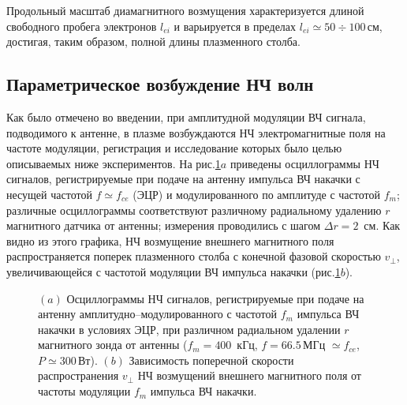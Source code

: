\documentclass[autoref,10pt]{disser}
\begin{document}
Продольный масштаб диамагнитного возмущения характеризуется длиной свободного пробега электронов $l_{ei}$ и варьируется в пределах $l_{ei}\simeq{}50\div{}100$\,см, достигая, таким образом, полной длины плазменного столба. 


\subsection{Параметрическое возбуждение НЧ волн}
Как было отмечено во введении, при амплитудной модуляции ВЧ сигнала, подводимого к антенне, в плазме возбуждаются НЧ электромагнитные поля на частоте модуляции, регистрация и исследование которых было целью описываемых ниже экспериментов.
На \mbox{рис.\ref{fig:phase_composite}$a$} приведены  осциллограммы НЧ сигналов, регистрируемые при подаче на антенну импульса ВЧ накачки с несущей частотой $f\simeq{}f_{ce}$ (ЭЦР) и модулированного по амплитуде с частотой $f_{m}$; различные осциллограммы соответствуют различному радиальному удалению $r$ магнитного датчика от антенны; измерения проводились с шагом $\Delta{}r = 2$~см. Как видно из этого графика, НЧ возмущение внешнего магнитного поля распространяется поперек плазменного столба с конечной фазовой скоростью $v_{\perp}$, увеличивающейся с частотой модуляции ВЧ импульса накачки (\mbox{рис.\ref{fig:phase_composite}$b$}).
\begin{figure}[H]
  \centering
  \def\svgwidth{0.6\columnwidth} %
  
  \caption{$(a)$ Осциллограммы НЧ сигналов, регистрируемые при подаче на антенну амплитудно--модулированного с частотой $f_{m}$ импульса ВЧ накачки в условиях ЭЦР, при различном радиальном удалении $r$ магнитного зонда от антенны ($f_{m} = 400$\, кГц, $f=66.5$\,МГц $\simeq f_{ce}$, $P\simeq 300$\,Вт). $(b)$ Зависимость поперечной скорости распространения $v_{\perp}$ НЧ возмущений внешнего магнитного поля от частоты модуляции $f_{m}$ импульса ВЧ накачки.}
  \label{fig:phase_composite}
\end{figure} 
\end{document}
